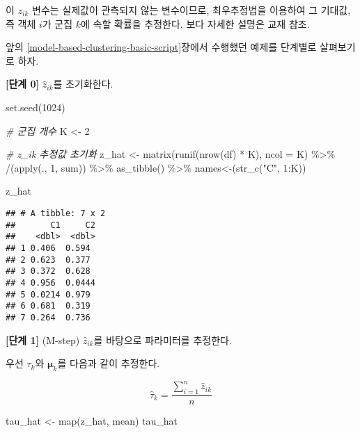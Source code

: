 \documentclass[
]{book}
\newenvironment{Shaded}{\begin{snugshade}}{\end{snugshade}}
\newcommand{\AttributeTok}[1]{\textcolor[rgb]{0.77,0.63,0.00}{#1}}
\newcommand{\CommentTok}[1]{\textcolor[rgb]{0.56,0.35,0.01}{\textit{#1}}}
\newcommand{\DecValTok}[1]{\textcolor[rgb]{0.00,0.00,0.81}{#1}}
\newcommand{\FunctionTok}[1]{\textcolor[rgb]{0.00,0.00,0.00}{#1}}
\newcommand{\NormalTok}[1]{#1}
\newcommand{\OtherTok}[1]{\textcolor[rgb]{0.56,0.35,0.01}{#1}}
\newcommand{\SpecialCharTok}[1]{\textcolor[rgb]{0.00,0.00,0.00}{#1}}
\newcommand{\StringTok}[1]{\textcolor[rgb]{0.31,0.60,0.02}{#1}}
\begin{document}
이 \(z_{ik}\) 변수는 실제값이 관측되지 않는 변수이므로, 최우추정법을 이용하여 그 기대값, 즉 객체 \(i\)가 군집 \(k\)에 속할 확률을 추정한다. 보다 자세한 설명은 교재 \citep{jun2012datamining} 참조.

앞의 \ref{model-based-clustering-basic-script}장에서 수행했던 예제를 단계별로 살펴보기로 하자.

\textbf{{[}단계 0{]}} \(\hat{z}_{ik}\)를 초기화한다.

\begin{Shaded}
\begin{Highlighting}[]
\FunctionTok{set.seed}\NormalTok{(}\DecValTok{1024}\NormalTok{)}

\CommentTok{\# 군집 개수}
\NormalTok{K }\OtherTok{\textless{}{-}} \DecValTok{2}

\CommentTok{\# z\_ik 추정값 초기화}
\NormalTok{z\_hat }\OtherTok{\textless{}{-}} \FunctionTok{matrix}\NormalTok{(}\FunctionTok{runif}\NormalTok{(}\FunctionTok{nrow}\NormalTok{(df) }\SpecialCharTok{*}\NormalTok{ K), }\AttributeTok{ncol =}\NormalTok{ K) }\SpecialCharTok{\%\textgreater{}\%}
  \StringTok{\textasciigrave{}}\AttributeTok{/}\StringTok{\textasciigrave{}}\NormalTok{(}\FunctionTok{apply}\NormalTok{(., }\DecValTok{1}\NormalTok{, sum)) }\SpecialCharTok{\%\textgreater{}\%}
  \FunctionTok{as\_tibble}\NormalTok{() }\SpecialCharTok{\%\textgreater{}\%}
  \StringTok{\textasciigrave{}}\AttributeTok{names\textless{}{-}}\StringTok{\textasciigrave{}}\NormalTok{(}\FunctionTok{str\_c}\NormalTok{(}\StringTok{"C"}\NormalTok{, }\DecValTok{1}\SpecialCharTok{:}\NormalTok{K))}

\NormalTok{z\_hat}
\end{Highlighting}
\end{Shaded}

\begin{verbatim}
## # A tibble: 7 x 2
##       C1     C2
##    <dbl>  <dbl>
## 1 0.406  0.594 
## 2 0.623  0.377 
## 3 0.372  0.628 
## 4 0.956  0.0444
## 5 0.0214 0.979 
## 6 0.681  0.319 
## 7 0.264  0.736
\end{verbatim}

\textbf{{[}단계 1{]}} (M-step) \(\hat{z}_{ik}\)를 바탕으로 파라미터를 추정한다.

우선 \(\tau_k\)와 \(\boldsymbol\mu_k\)를 다음과 같이 추정한다.

\begin{equation*}
\hat{\tau}_k = \frac{\sum_{i = 1}^{n} \hat{z}_{ik}}{n}
\end{equation*}

\begin{Shaded}
\begin{Highlighting}[]
\NormalTok{tau\_hat }\OtherTok{\textless{}{-}} \FunctionTok{map}\NormalTok{(z\_hat, mean)}
\NormalTok{tau\_hat}
\end{Highlighting}
\end{Shaded}
\end{document}
